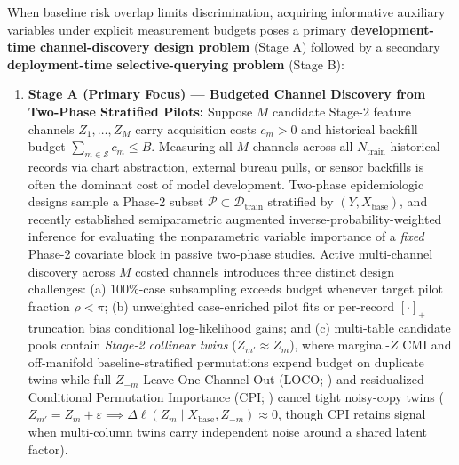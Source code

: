 \documentclass[11pt]{article}
\theoremstyle{remark}
\begin{document}
When baseline risk overlap limits discrimination, acquiring informative auxiliary variables under explicit measurement budgets poses a primary \textbf{development-time channel-discovery design problem} (Stage A) followed by a secondary \textbf{deployment-time selective-querying problem} (Stage B):
\begin{enumerate}
  \item \textbf{Stage A (Primary Focus) --- Budgeted Channel Discovery from Two-Phase Stratified Pilots:} Suppose $M$ candidate Stage-2 feature channels $Z_1, \dots, Z_M$ carry acquisition costs $c_m > 0$ and historical backfill budget $\sum_{m \in \mathcal{S}} c_m \le B$. Measuring all $M$ channels across all $N_{\text{train}}$ historical records via chart abstraction, external bureau pulls, or sensor backfills is often the dominant cost of model development. Two-phase epidemiologic designs \citep{prentice1986casecohort,breslow1988logistic,breslow2009using,lumley2010complex,mcisaac2015adaptive,tao2017efficient,tao2020optimal} sample a Phase-2 subset $\mathcal{P} \subset \mathcal{D}_{\text{train}}$ stratified by $(Y, X_{\text{base}})$, and \citet{dai2025twophase} recently established semiparametric augmented inverse-probability-weighted inference for evaluating the nonparametric variable importance \citep{williamson2021nonparametric,williamson2023general} of a \emph{fixed} Phase-2 covariate block in passive two-phase studies. Active multi-channel discovery across $M$ costed channels introduces three distinct design challenges: (a) $100\%$-case subsampling exceeds budget whenever target pilot fraction $\rho < \pi$; (b) unweighted case-enriched pilot fits or per-record $[\cdot]_+$ truncation bias conditional log-likelihood gains; and (c) multi-table candidate pools contain \emph{Stage-2 collinear twins} ($Z_{m'} \approx Z_m$), where marginal-$Z$ CMI and off-manifold baseline-stratified permutations \citep{hooker2021unrestricted} expend budget on duplicate twins while full-$Z_{-m}$ Leave-One-Channel-Out (LOCO; \citealp{williamson2021nonparametric}) and residualized Conditional Permutation Importance (CPI; \citealp{chamma2023statistically}) cancel tight noisy-copy twins ($Z_{m'} = Z_m + \varepsilon \implies \Delta\ell(Z_m \mid X_{\text{base}}, Z_{-m}) \approx 0$, though CPI retains signal when multi-column twins carry independent noise around a shared latent factor).

\end{enumerate}
\end{document}
